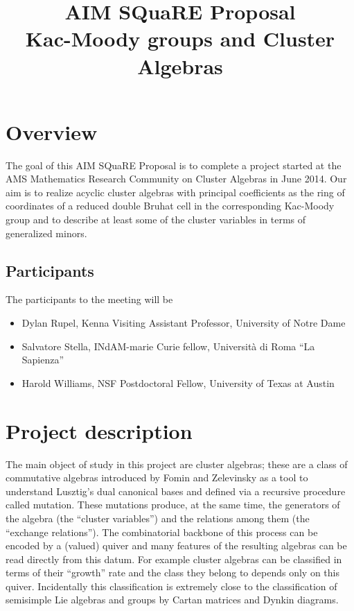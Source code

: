 \documentclass{amsart}
\title[\small{Kac-Moody groups and Cluster Algebras}]
  {AIM SQuaRE Proposal\\ 
  \small{Kac-Moody groups and Cluster Algebras}}
\begin{document}
  \maketitle
  
  \section*{Overview}
    The goal of this AIM SQuaRE Proposal is to complete a project started at the AMS Mathematics Research Community on Cluster Algebras in June 2014.
    Our aim is to realize acyclic cluster algebras with principal coefficients as the ring of coordinates of a reduced double Bruhat cell in the corresponding Kac-Moody group and to describe at least some of the cluster variables in terms of generalized minors.
    
  \subsection*{Participants}
    The participants to the meeting will be 
    \begin{itemize}
      \item Dylan Rupel, Kenna Visiting Assistant Professor, University of Notre Dame 
      \item Salvatore Stella, INdAM-marie Curie fellow, Università di Roma ``La Sapienza''
      \item Harold Williams, NSF Postdoctoral Fellow, University of Texas at Austin
    \end{itemize}
  
  \section*{Project description}

  The main object of study in this project are cluster algebras; these are a class of commutative algebras introduced by Fomin and Zelevinsky as a tool to understand Lusztig's dual canonical bases and  defined via a recursive procedure called mutation. 
  These mutations produce, at the same time, the generators of the algebra (the ``cluster variables'') and the relations among them (the ``exchange relations'').
  The combinatorial backbone of this process can be encoded by a (valued) quiver and many features of the resulting algebras can be read directly from this datum.
  For example cluster algebras can be classified in terms of their ``growth'' rate and the class they belong to depends only on this quiver.
  Incidentally this classification is extremely close to the classification of semisimple Lie algebras and groups by Cartan matrices and Dynkin diagrams. 
\end{document}
